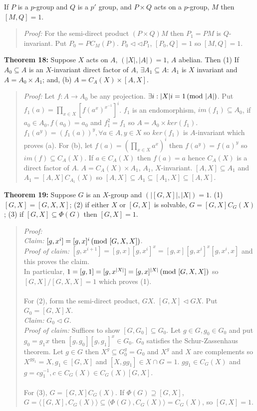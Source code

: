 If $P$ is a $p$-group and $Q$ is a $p'$ group, and $P \times Q$ acts on a $p$-group,
$M$ then $[M,Q] = 1$.
\begin{quote}
\emph{Proof:}
For the semi-direct product $(P \times Q)M$ then $P_1= PM$ is $Q$-invariant.  Put
$P_0=P C_M(P)$.  $P_0 \lhd \lhd P_1$, $[P_0, Q]= 1$ so $[M, Q] = 1$.
\end{quote}
{\bf Theorem 18:}
Suppose $X$ acts on $A$, $(|X|, |A|)= 1$, $A$ abelian.  Then
(1) If $A_0 \subseteq A$ is an $X$-invariant direct factor of $A$, $\exists A_1 \subseteq A$:
$A_1$ is $X$ invariant and $A= A_0 \times A_1$; and,
(b) $A= C_A(X) \times [A,X]$.
\begin{quote}
\emph{Proof:}
Let $f: A \rightarrow A_0$ be any projection.  $\exists i: |X|i= 1 \thinspace \textnormal{(mod } |A| \textnormal{)}$.
Put $f_1(a)= \prod_{x \in X} [f(a^x)^{x^{-1}}]^i$.
$f_1$ is an endomorphism, $im(f_1) \subseteq A_0$, if $a_0 \in A_0, f(a_0) =a_0$ and
$f_1^2= f_1$
so $A= A_0 \times ker(f_1)$.
$f_1(a^y)= (f_1(a))^y, \forall a \in A, y \in X$ so $ker(f_1)$ is $A$-invariant which proves (a).
For (b), let $f(a)= (\prod_{x \in X} a^x)^i$ then
$f(a^y)= f(a)^y$ so $im(f) \subseteq C_A(X)$.   If $a \in C_A(X)$ then
$f(a)=a$ hence $C_A(X)$ is a direct factor of $A$.
$A= C_A(X) \times A_1$, $A_1$, $X$-invariant.  $[A, X] \subseteq A_1$ and
$A_1= [A, X] C_{A_1}(X)$  so $[A, X] \subseteq A_1 \subseteq [A_1 , X] \subseteq [A, X]$.
\end{quote}
{\bf Theorem 19:}   Suppose $G$ is an $X$-group and $(|[G, X]|, |X|) = 1$.
(1) $[G,X]= [G, X, X]$; (2) if either $X$ or $[G, X]$ is solvable, $G= [G,X]C_G(X)$;
(3) if $[G, X] \subseteq \Phi(G)$ then
$[G, X] = 1$.
\begin{quote}
\emph{Proof:}
\\
\emph{Claim:} $[g, x^i] = [g, x]^i \thinspace \textnormal{(mod } [G, X, X] \textnormal{)}$.
\\
\emph{Proof of claim:} $[g, x^{i+1}] = [g, x] [g, x^i]^x = [g, x] [g, x^i]^x [g, x^i, x]$ and this proves the claim.
\\
In particular, $1 = [g,1] = [g, x^{|X|}]=
[g, x]^{|X|} \thinspace \textnormal{(mod } [G, X, X] \textnormal{)}$ so $[G,X]/[G,X,X] =1$ which proves (1).
\\
\\
For (2), form the semi-direct product, $GX$.  $[G,X] \lhd GX$.  Put $G_0 = [G, X]X$.
\\
\emph{Claim:} $G_0 \lhd G$.
\\
\emph{Proof of claim:}
Suffices to show $[G, G_0] \subseteq G_0$.  Let $g \in G, g_0 \in G_0$ and put
$g_0 = g_1 x$ then $[g, g_0] [g, g_1]^x \in G_0$.  $G_0$ satisfies the Schur-Zassenhaus theorem.
Let $g \in G$ then $X^g \subseteq G_0^g = G_0$ and $X^g$ and $X$ are complements so
$X^{g g_1} = X, g_1 \in [G, X]$ and $[X, g g_1] \in  X \cap G = 1$.
$g g_1 \in C_G(X)$ and $g= c g_1^{-1}, c \in C_G(X) \in C_G(X)[G,X]$.
\\
\\
For (3), $G= [G,X] C_G(X)$.  If $\Phi(G) \supseteq [G,X]$, $G= \langle [G, X], C_G(X) \rangle \subseteq
\langle \Phi(G), C_G(X) \rangle =  C_G(X)$, so $[G, X]= 1$.
\end{quote}
